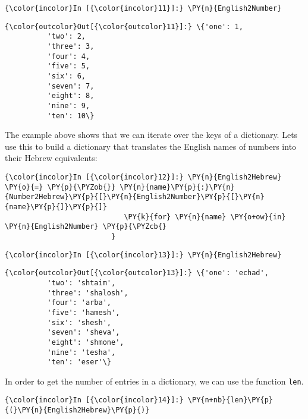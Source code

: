 \begin{Verbatim}[commandchars=\\\{\}]
{\color{incolor}In [{\color{incolor}11}]:} \PY{n}{English2Number}
\end{Verbatim}

\begin{Verbatim}[commandchars=\\\{\}]
{\color{outcolor}Out[{\color{outcolor}11}]:} \{'one': 1,
          'two': 2,
          'three': 3,
          'four': 4,
          'five': 5,
          'six': 6,
          'seven': 7,
          'eight': 8,
          'nine': 9,
          'ten': 10\}
\end{Verbatim}
The example above shows that we can iterate over the keys of a
dictionary. Lets use this to build a dictionary that translates the
English names of numbers into their Hebrew equivalents:
\begin{Verbatim}[commandchars=\\\{\}]
{\color{incolor}In [{\color{incolor}12}]:} \PY{n}{English2Hebrew} \PY{o}{=} \PY{p}{\PYZob{}} \PY{n}{name}\PY{p}{:}\PY{n}{Number2Hebrew}\PY{p}{[}\PY{n}{English2Number}\PY{p}{[}\PY{n}{name}\PY{p}{]}\PY{p}{]}
                            \PY{k}{for} \PY{n}{name} \PY{o+ow}{in} \PY{n}{English2Number} \PY{p}{\PYZcb{}
                         }
\end{Verbatim}

\begin{Verbatim}[commandchars=\\\{\}]
{\color{incolor}In [{\color{incolor}13}]:} \PY{n}{English2Hebrew}
\end{Verbatim}

\begin{Verbatim}[commandchars=\\\{\}]
{\color{outcolor}Out[{\color{outcolor}13}]:} \{'one': 'echad',
          'two': 'shtaim',
          'three': 'shalosh',
          'four': 'arba',
          'five': 'hamesh',
          'six': 'shesh',
          'seven': 'sheva',
          'eight': 'shmone',
          'nine': 'tesha',
          'ten': 'eser'\}
\end{Verbatim}
In order to get the number of entries in a dictionary, we can use the
function \texttt{len}.
\begin{Verbatim}[commandchars=\\\{\}]
{\color{incolor}In [{\color{incolor}14}]:} \PY{n+nb}{len}\PY{p}{(}\PY{n}{English2Hebrew}\PY{p}{)}
\end{Verbatim}


